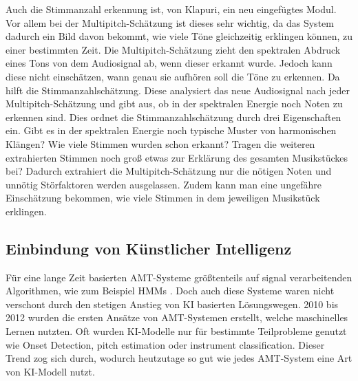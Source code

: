 \begin{description}[style=nextline]
\item[Multipitch-Schätzung]\label{itm:multi}
Auch die Stimmanzahl erkennung ist, von Klapuri, ein neu eingefügtes Modul.
Vor allem bei der Multipitch-Schätzung ist dieses sehr wichtig, da das System dadurch ein Bild davon bekommt,
wie viele Töne gleichzeitig erklingen können, zu einer bestimmten Zeit.
Die Multipitch-Schätzung zieht den spektralen Abdruck eines Tons von dem Audiosignal ab, wenn dieser erkannt wurde.
Jedoch kann diese nicht einschätzen, wann genau sie aufhören soll die Töne zu erkennen.
Da hilft die Stimmanzahlschätzung.
Diese analysiert das neue Audiosignal nach jeder Multipitch-Schätzung und gibt aus,
ob in der spektralen Energie noch Noten zu erkennen sind.
Dies ordnet die Stimmanzahlschätzung durch drei Eigenschaften ein.
Gibt es in der spektralen Energie noch typische Muster von harmonischen Klängen?
Wie viele Stimmen wurden schon erkannt?
Tragen die weiteren extrahierten Stimmen noch groß etwas zur Erklärung des gesamten Musikstückes bei?
Dadurch extrahiert die Multipitch-Schätzung nur die nötigen Noten und unnötig Störfaktoren werden ausgelassen.
Zudem kann man eine ungefähre Einschätzung bekommen, wie viele Stimmen in dem jeweiligen Musikstück erklingen.
\end{description}

\subsection{Einbindung von Künstlicher Intelligenz}
Für eine lange Zeit basierten AMT-Systeme größtenteils auf signal verarbeitenden Algorithmen,
wie zum Beispiel HMMs .
Doch auch diese Systeme waren nicht verschont durch den stetigen Anstieg von KI basierten Lösungswegen.
2010 bis 2012 wurden die ersten Ansätze von AMT-Systemen erstellt, welche maschinelles Lernen nutzten.
\cite{eyben2010universal}
Oft wurden KI-Modelle nur für bestimmte Teilprobleme genutzt
wie Onset Detection, pitch estimation oder instrument classification.
Dieser Trend zog sich durch, wodurch heutzutage so gut wie jedes AMT-System eine Art von KI-Modell nutzt.

